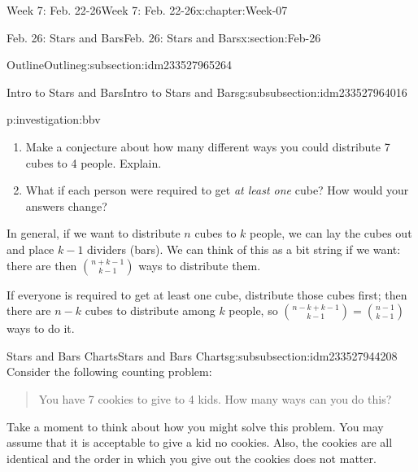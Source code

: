 \documentclass[oneside,10pt,]{book}
\numberwithin{equation}{section}
\begin{document}
\begin{chapterptx}{Week 7: Feb. 22-26}{}{Week 7: Feb. 22-26}{}{}{x:chapter:Week-07}
\begin{sectionptx}{Feb. 26: Stars and Bars}{}{Feb. 26: Stars and Bars}{}{}{x:section:Feb-26}
\begin{subsectionptx}{Outline}{}{Outline}{}{}{g:subsection:idm233527965264}
\begin{subsubsectionptx}{Intro to Stars and Bars}{}{Intro to Stars and Bars}{}{}{g:subsubsection:idm233527964016}
\begin{investigation}{}{p:investigation:bbv}
\begin{enumerate}
%
\begin{enumerate}
\item{}You have 3 cubes to give to 2 people.%
\item{}You have 4 cubes to give to 2 people.%
\item{}You have 5 cubes to give to 2 people.%
\item{}You have 3 cubes to give to 3 people.%
\item{}You have 4 cubes to give to 3 people.%
\item{}You have 5 cubes to give to 3 people.%
\end{enumerate}
%
\item{}Make a conjecture about how many different ways you could distribute 7 cubes to 4 people. Explain.%
\item{}What if each person were required to get \emph{at least one} cube? How would your answers change?%
\end{enumerate}
%
\par\smallskip%
\noindent\hypertarget{g:solution:idm233527948016}{}In general, if we want to distribute \(n\) cubes to \(k\) people, we can lay the cubes out and place \(k-1\) dividers (bars). We can think of this as a bit string if we want: there are then \(\binom{n+k-1}{k-1}\) ways to distribute them.%
\par
If everyone is required to get at least one cube, distribute those cubes first; then there are \(n-k\) cubes to distribute among \(k\) people, so \(\binom{n-k+k-1}{k-1} = \binom{n-1}{k-1}\) ways to do it.%
\end{investigation}%
\end{subsubsectionptx}
%
%
\typeout{************************************************}
\typeout{************************************************}
%
\begin{subsubsectionptx}{Stars and Bars Charts}{}{Stars and Bars Charts}{}{}{g:subsubsection:idm233527944208}
Consider the following counting problem:%
\begin{quote}%
You have 7 cookies to give to 4 kids. How many ways can you do this?%
\end{quote}
Take a moment to think about how you might solve this problem. You may assume that it is acceptable to give a kid no cookies. Also, the cookies are all identical and the order in which you give out the cookies does not matter.%
\par

\end{subsubsectionptx}
\end{subsectionptx}
\end{sectionptx}
\end{chapterptx}
\end{document}
